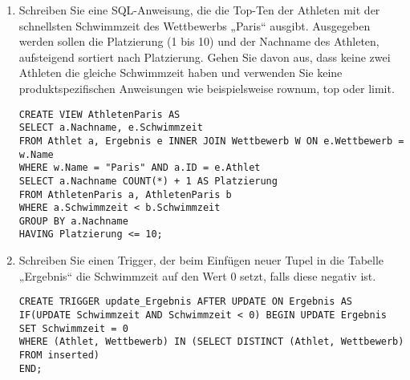 \documentclass{lehramt-informatik-aufgabe}
\begin{document}
\begin{enumerate}

\item Schreiben Sie eine SQL-Anweisung, die die Top-Ten der Athleten mit
der schnellsten Schwimmzeit des Wettbewerbs „Paris“ ausgibt. Ausgegeben
werden sollen die Platzierung (1 bis 10) und der Nachname des Athleten,
aufsteigend sortiert nach Platzierung. Gehen Sie davon aus, dass keine
zwei Athleten die gleiche Schwimmzeit haben und verwenden Sie keine
produktspezifischen Anweisungen wie beispielsweise rownum, top oder
limit.

\begin{liAntwort}
\begin{verbatim}
CREATE VIEW AthletenParis AS
SELECT a.Nachname, e.Schwimmzeit
FROM Athlet a, Ergebnis e INNER JOIN Wettbewerb W ON e.Wettbewerb = w.Name
WHERE w.Name = "Paris" AND a.ID = e.Athlet
SELECT a.Nachname COUNT(*) + 1 AS Platzierung
FROM AthletenParis a, AthletenParis b
WHERE a.Schwimmzeit < b.Schwimmzeit
GROUP BY a.Nachname
HAVING Platzierung <= 10;
\end{verbatim}
\end{liAntwort}


\item Schreiben Sie einen Trigger, der beim Einfügen neuer Tupel in die
Tabelle „Ergebnis“ die Schwimmzeit auf den Wert 0 setzt, falls diese
negativ ist.

\begin{liAntwort}
\begin{verbatim}
CREATE TRIGGER update_Ergebnis AFTER UPDATE ON Ergebnis AS
IF(UPDATE Schwimmzeit AND Schwimmzeit < 0) BEGIN UPDATE Ergebnis
SET Schwimmzeit = 0
WHERE (Athlet, Wettbewerb) IN (SELECT DISTINCT (Athlet, Wettbewerb) FROM inserted)
END;
\end{verbatim}
\end{liAntwort}

\end{enumerate}
\end{document}
